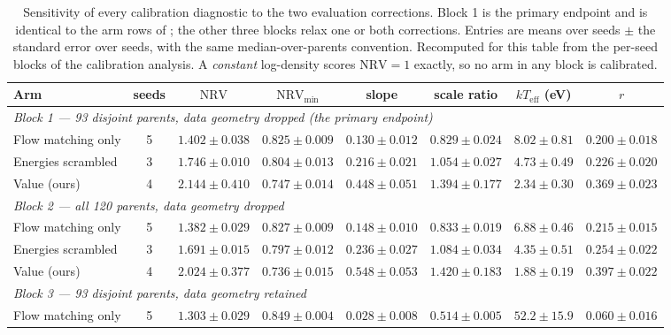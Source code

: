 \begin{table}[h]
\caption{Sensitivity of every calibration diagnostic to the two evaluation
corrections. Block 1 is the primary endpoint and is identical to the arm rows of
; the other three blocks relax one or both corrections. Entries
are means over seeds $\pm$ the standard error over seeds, with the same
median-over-parents convention. Recomputed for this table from the per-seed blocks of
the calibration analysis. A \emph{constant} log-density scores $\mathrm{NRV} = 1$
exactly, so no arm in any block is calibrated.}
\label{tab:scaleperm}
\begin{center}
\scriptsize
\setlength{\tabcolsep}{2.5pt}
\begin{tabular}{lccccccc}
\toprule
Arm & seeds & $\mathrm{NRV}$ & $\mathrm{NRV}_{\min}$ & slope & scale ratio & $kT_{\mathrm{eff}}$ (eV) & $r$ \\
\midrule
\multicolumn{8}{l}{\emph{Block 1 --- 93 disjoint parents, data geometry dropped (the primary endpoint)}} \\
Flow matching only  & 5 & $1.402 \pm 0.038$ & $0.825 \pm 0.009$ & $0.130 \pm 0.012$ & $0.829 \pm 0.024$ & $8.02 \pm 0.81$ & $0.200 \pm 0.018$ \\
Energies scrambled  & 3 & $1.746 \pm 0.010$ & $0.804 \pm 0.013$ & $0.216 \pm 0.021$ & $1.054 \pm 0.027$ & $4.73 \pm 0.49$ & $0.226 \pm 0.020$ \\
Value (ours)        & 4 & $2.144 \pm 0.410$ & $0.747 \pm 0.014$ & $0.448 \pm 0.051$ & $1.394 \pm 0.177$ & $2.34 \pm 0.30$ & $0.369 \pm 0.023$ \\
\midrule
\multicolumn{8}{l}{\emph{Block 2 --- all 120 parents, data geometry dropped}} \\
Flow matching only  & 5 & $1.382 \pm 0.029$ & $0.827 \pm 0.009$ & $0.148 \pm 0.010$ & $0.833 \pm 0.019$ & $6.88 \pm 0.46$ & $0.215 \pm 0.015$ \\
Energies scrambled  & 3 & $1.691 \pm 0.015$ & $0.797 \pm 0.012$ & $0.236 \pm 0.027$ & $1.084 \pm 0.034$ & $4.35 \pm 0.51$ & $0.254 \pm 0.022$ \\
Value (ours)        & 4 & $2.024 \pm 0.377$ & $0.736 \pm 0.015$ & $0.548 \pm 0.053$ & $1.420 \pm 0.183$ & $1.88 \pm 0.19$ & $0.397 \pm 0.022$ \\
\midrule
\multicolumn{8}{l}{\emph{Block 3 --- 93 disjoint parents, data geometry retained}} \\
Flow matching only  & 5 & $1.303 \pm 0.029$ & $0.849 \pm 0.004$ & $0.028 \pm 0.008$ & $0.514 \pm 0.005$ & $52.2 \pm 15.9$ & $0.060 \pm 0.016$ \\

\end{tabular}
\end{center}
\end{table}

